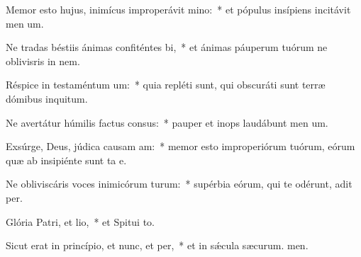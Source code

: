 \item Memor esto hujus, inimícus improperávit mino:~* et pópulus insípiens incitávit men um.
\item Ne tradas béstiis ánimas confiténtes bi,~* et ánimas páuperum tuórum ne oblivisris in nem.
\item Réspice in testaméntum um:~* quia repléti sunt, qui obscuráti sunt terræ dómibus inquitum.
\item Ne avertátur húmilis factus consus:~* pauper et inops laudábunt men um.
\item Exsúrge, Deus, júdica causam am:~* memor esto improperiórum tuórum, eórum quæ ab insipiénte sunt ta e.
\item Ne obliviscáris voces inimicórum turum:~* supérbia eórum, qui te odérunt, adit per.
\item Glória Patri, et lio,~* et Spitui to.
\item Sicut erat in princípio, et nunc, et per,~* et in sǽcula sæcurum. men.
